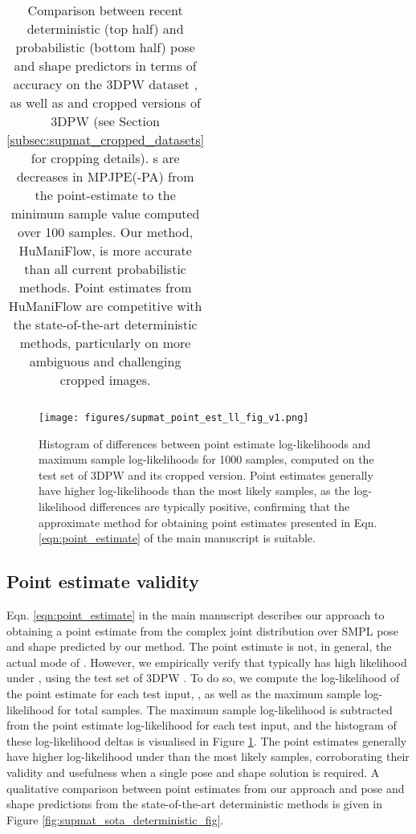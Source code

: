 \begin{table*}[t]
\begin{tabular}{l | c c c c | c c c c | c c c c}
\hline
\end{tabular}
\vspace{-0.1cm}
\caption{Comparison between recent deterministic (top half) and probabilistic (bottom half) pose and shape predictors in terms of accuracy on the 3DPW dataset \cite{vonMarcard2018}, as well as  and  cropped versions of 3DPW (see Section \ref{subsec:supmat_cropped_datasets} for cropping details). s are decreases in MPJPE(-PA) from the point-estimate to the minimum sample value computed over 100 samples. Our method, HuManiFlow, is more accurate than all current probabilistic methods. Point estimates from HuManiFlow are competitive with the state-of-the-art deterministic methods, particularly on more ambiguous and challenging cropped images.}
\label{table:supmat_3dpw_sota_comparison_accuracy}
\vspace{-0.1cm}
\end{table*}

\begin{figure}
    \centering
    \texttt{[image: figures/supmat\_point\_est\_ll\_fig\_v1.png]}
    \caption{Histogram of differences between point estimate log-likelihoods and maximum sample log-likelihoods for 1000 samples, computed on the test set of 3DPW \cite{vonMarcard2018} and its cropped version. Point estimates generally have higher log-likelihoods than the most likely samples, as the log-likelihood differences are typically positive, confirming that the approximate method for obtaining point estimates presented in Eqn. \ref{eqn:point_estimate} of the main manuscript is suitable.}
    \label{fig:supmat_point_est_ll}
\end{figure}

\subsection{Point estimate validity}

Eqn. \ref{eqn:point_estimate} in the main manuscript describes our approach to obtaining a point estimate  from the complex joint distribution over SMPL pose and shape  predicted by our method. The point estimate is not, in general, the actual mode of . However, we empirically verify that  typically has high likelihood under , using the test set of 3DPW \cite{vonMarcard2018}. To do so, we compute the log-likelihood of the point estimate for each test input, , as well as the maximum sample log-likelihood  for  total samples. The maximum sample log-likelihood is subtracted from the point estimate log-likelihood for each test input, and the histogram of these log-likelihood deltas is visualised in Figure \ref{fig:supmat_point_est_ll}. The point estimates generally have higher log-likelihood under  than the most likely samples, corroborating their validity and usefulness when a single pose and shape solution is required. A qualitative comparison between point estimates from our approach and pose and shape predictions from the state-of-the-art deterministic methods \cite{Kocabas_PARE_2021, li2020hybrik} is given in Figure \ref{fig:supmat_sota_deterministic_fig}.

